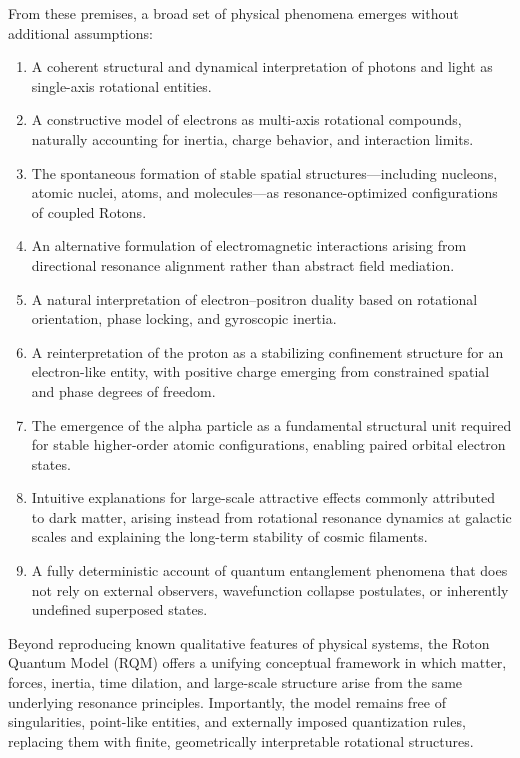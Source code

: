 \documentclass[11pt,a4paper]{article}
\begin{document}
From these premises, a broad set of physical phenomena emerges without additional assumptions:
\begin{enumerate}
  \item A coherent structural and dynamical interpretation of photons and light as single-axis rotational entities.
  \item A constructive model of electrons as multi-axis rotational compounds, naturally accounting for inertia, charge behavior, and interaction limits.
  \item The spontaneous formation of stable spatial structures—including nucleons, atomic nuclei, atoms, and molecules—as resonance-optimized configurations of coupled Rotons.
  \item An alternative formulation of electromagnetic interactions arising from directional resonance alignment rather than abstract field mediation.
  \item A natural interpretation of electron–positron duality based on rotational orientation, phase locking, and gyroscopic inertia.
  \item A reinterpretation of the proton as a stabilizing confinement structure for an electron-like entity, with positive charge emerging from constrained spatial and phase degrees of freedom.
  \item The emergence of the alpha particle as a fundamental structural unit required for stable higher-order atomic configurations, enabling paired orbital electron states.
  \item Intuitive explanations for large-scale attractive effects commonly attributed to dark matter, arising instead from rotational resonance dynamics at galactic scales and explaining the long-term stability of cosmic filaments.
  \item A fully deterministic account of quantum entanglement phenomena that does not rely on external observers, wavefunction collapse postulates, or inherently undefined superposed states.
\end{enumerate}

Beyond reproducing known qualitative features of physical systems, the Roton Quantum Model (RQM) offers a unifying conceptual framework in which matter, forces, inertia, time dilation, and large-scale structure arise from the same underlying resonance principles. Importantly, the model remains free of singularities, point-like entities, and externally imposed quantization rules, replacing them with finite, geometrically interpretable rotational structures.
\end{document}
